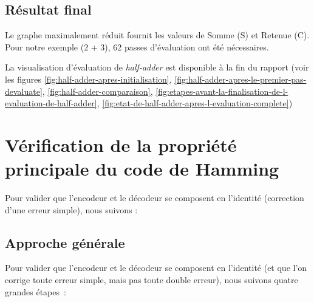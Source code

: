 \documentclass[a4paper,12pt]{article}
\begin{document}
\subsection{Résultat final}
Le graphe maximalement réduit fournit les valeurs de Somme (S) et Retenue (C). Pour notre exemple (2 + 3), 62 passes d'évaluation ont été nécessaires.

La visualisation d'évaluation de \textit{half-adder} est disponible à la fin du rapport (voir les figures \ref{fig:half-adder-apres-initialisation}, \ref{fig:half-adder-apres-le-premier-pas-devaluate}, \ref{fig:half-adder-comparaison}, \ref{fig:etapes-avant-la-finalisation-de-l-evaluation-de-half-adder}, \ref{fig:etat-de-half-adder-apres-l-evaluation-complete})

\section{Vérification de la propriété principale du code de Hamming}
Pour valider que l'encodeur et le décodeur se composent en l'identité (correction d'une erreur simple), nous suivons :

\subsection{Approche générale}

Pour valider que l’encodeur et le décodeur se composent en l’identité (et que l’on corrige toute erreur simple, mais pas toute double erreur), nous suivons quatre grandes étapes~:
\end{document}
